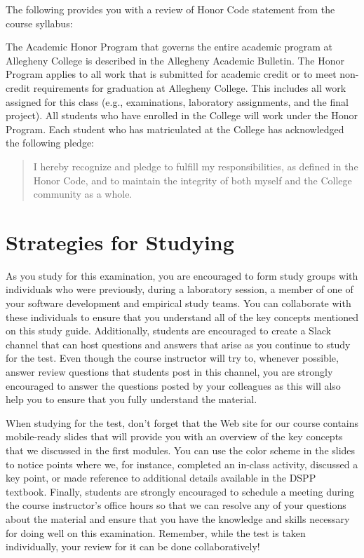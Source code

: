 \noindent The following provides you with a review of Honor Code statement from the course syllabus:

The Academic Honor Program that governs the entire academic program at Allegheny College is described in the Allegheny
Academic Bulletin.  The Honor Program applies to all work that is submitted for academic credit or to meet non-credit
requirements for graduation at Allegheny College.  This includes all work assigned for this class (e.g., examinations,
laboratory assignments, and the final project).  All students who have enrolled in the College will work under the Honor
Program.  Each student who has matriculated at the College has acknowledged the following pledge:

\vspace*{-.11in}
\begin{quote}
  I hereby recognize and pledge to fulfill my responsibilities, as defined in the Honor Code, and to maintain the
  integrity of both myself and the College community as a whole.
\end{quote}
\vspace*{-.11in}

\vspace*{-.2in}
\section*{Strategies for Studying}
\vspace*{-.1in}

As you study for this examination, you are encouraged to form study groups with individuals who were previously, during
a laboratory session, a member of one of your software development and empirical study teams. You can collaborate with
these individuals to ensure that you understand all of the key concepts mentioned on this study guide. Additionally,
students are encouraged to create a Slack channel that can host questions and answers that arise as you continue to
study for the test.  Even though the course instructor will try to, whenever possible, answer review questions that
students post in this channel, you are strongly encouraged to answer the questions posted by your colleagues as this
will also help you to ensure that you fully understand the material.

When studying for the test, don't forget that the Web site for our course contains mobile-ready slides that will provide
you with an overview of the key concepts that we discussed in the first modules. You can use the color scheme in the
slides to notice points where we, for instance, completed an in-class activity, discussed a key point, or made reference
to additional details available in the DSPP textbook. Finally, students are strongly encouraged to schedule a meeting
during the course instructor's office hours so that we can resolve any of your questions about the material and ensure
that you have the knowledge and skills necessary for doing well on this examination. Remember, while the test is taken
individually, your review for it can be done collaboratively!


